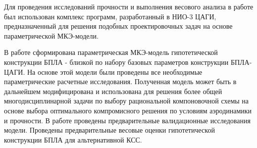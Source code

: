 Для проведения исследований прочности и выполнения весового анализа в работе был использован комплекс программ, разработанный в НИО-3 ЦАГИ, предназначенный для решения подобных проектировочных задач на основе параметрической МКЭ-модели.

В работе сформирована параметрическая МКЭ-модель гипотетической конструкции БПЛА - близкой по набору базовых параметров конструкции БПЛА-ЦАГИ. На основе этой модели были проведены все необходимые параметрические расчетные исследования. Полученная модель может быть в дальнейшем модифицирована и использована для решения более общей многодисциплинарной задачи по выбору рациональной компоновочной схемы на основе выбора оптимального компромисного решения по условиям аэродинамики и прочности. В работе проведены предварительные валидационные исследования модели. Проведены предварительные весовые оценки гипотетической конструкции БПЛА для альтернативной КСС.   

 